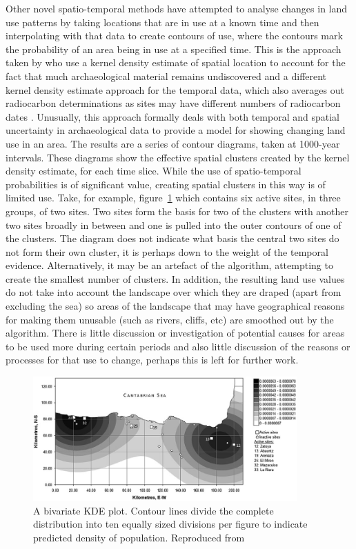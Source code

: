 Other novel spatio-temporal methods have attempted to analyse changes in land use patterns by taking locations that are in use at a known time and then interpolating with that data to create contours of use, where the contours mark the probability of an area being in use at a specified time. This is the approach taken by \citet{ARCM:ARCM578} who use a kernel density estimate of spatial location to account for the fact that much archaeological material remains undiscovered \citep[1014]{ARCM:ARCM578} and a different kernel density estimate approach for the temporal data, which also averages out radiocarbon determinations as sites may have different numbers of radiocarbon dates \citep[1019]{ARCM:ARCM578}. Unusually, this approach formally deals with both temporal and spatial uncertainty in archaeological data to provide a model for showing changing land use in an area. The results are a series of contour diagrams, taken at 1000-year intervals. These diagrams show the effective spatial clusters created by the kernel density estimate, for each time slice. While the use of spatio-temporal probabilities is of significant value, creating spatial clusters in this way is of limited use. Take, for example, figure~\ref{fig:kde} which contains six active sites, in three groups, of two sites. Two sites form the basis for two of the clusters with another two sites broadly in between and one is pulled into the outer contours of one of the clusters. The diagram does not indicate what basis the central two sites do not form their own cluster, it is perhaps down to the weight of the temporal evidence. Alternatively, it may be an artefact of the algorithm, attempting to create the smallest number of clusters. In addition, the resulting land use values do not take into account the landscape over which they are draped (apart from excluding the sea) so areas of the landscape that may have geographical reasons for making them unusable (such as rivers, cliffs, etc) are smoothed out by the algorithm. There is little discussion or investigation of potential causes for areas to be used more during certain periods and also little discussion of the reasons or processes for that use to change, perhaps this is left for further work. 

\begin{figure}
\centering
	\includegraphics[width=0.9\textwidth,height=0.9\textheight,keepaspectratio=true]{figures/kde-plot}
  \caption{A bivariate KDE plot. Contour lines divide the
complete distribution into ten equally sized divisions per figure to indicate predicted density of population. Reproduced from \citet[1024]{ARCM:ARCM578}}
  \label{fig:kde}
\end{figure}

